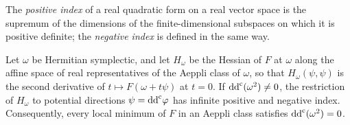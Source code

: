 The \emph{positive index} of a real quadratic form on a real vector space is the supremum of the dimensions of the finite-dimensional subspaces on which it is positive definite; the \emph{negative index} is defined in the same way.

\begin{theorem}\label{thm:completion-potential-hessian}
Let $\omega$ be Hermitian symplectic, and let $H_\omega$ be the Hessian of $F$ at $\omega$ along the affine space of real representatives of the Aeppli class of $\omega$, so that $H_\omega(\psi,\psi)$ is the second derivative of $t\mapsto F(\omega+t\psi)$ at $t=0$. If $\mathrm{dd}^{\mathrm{c}}(\omega^2)\ne0$, the restriction of $H_\omega$ to potential directions $\psi=\mathrm{dd}^{\mathrm{c}}\varphi$ has infinite positive and negative index. Consequently, every local minimum of $F$ in an Aeppli class satisfies $\mathrm{dd}^{\mathrm{c}}(\omega^2)=0$.
\end{theorem}
